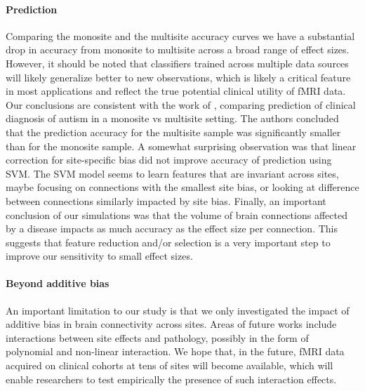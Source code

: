 \documentclass[authoryear]{elsarticle}
\begin{document}
\paragraph{Prediction}
Comparing the monosite and the multisite accuracy curves we have a substantial drop in accuracy from monosite to multisite across a broad range of effect sizes. However, it should be noted that classifiers trained across multiple data sources will likely generalize better to new observations, which is likely a critical feature in most applications and reflect the true potential clinical utility of fMRI data. Our conclusions are consistent with the work of \citep{Nielsen2013}, comparing prediction of clinical diagnosis of autism in a monosite vs multisite setting. The authors concluded that the prediction accuracy for the multisite sample was significantly smaller than for the monosite sample. A somewhat surprising observation was that linear correction for site-specific bias did not improve accuracy of prediction using SVM. The SVM model seems to learn features that are invariant across sites, maybe focusing on connections with the smallest site bias, or looking at difference between connections similarly impacted by site bias. Finally, an important conclusion of our simulations was that the volume of brain connections affected by a disease impacts as much accuracy as the effect size per connection. This suggests that feature reduction and/or selection is a very important step to improve our sensitivity to small effect sizes.

\paragraph{Beyond additive bias} An important limitation to our study is that we only investigated the impact of additive bias in brain connectivity across sites. Areas of future works include interactions between site effects and pathology, possibly in the form of polynomial and non-linear interaction. We hope that, in the future, fMRI data acquired on clinical cohorts at tens of sites will become available, which will enable researchers to test empirically the presence of such interaction effects. 
\end{document}
